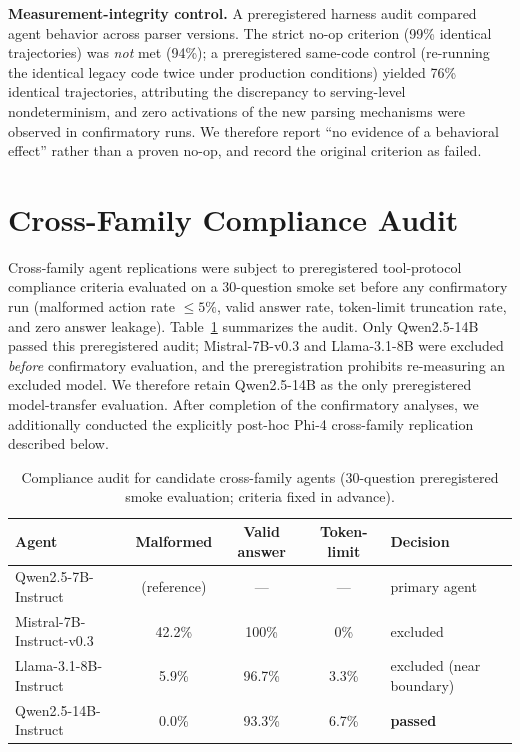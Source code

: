 \documentclass[10pt]{article}
\newcommand{\stitle}[1]{\vspace{0.4em}\noindent\textbf{#1}\hspace{0.6em}}
\begin{document}
\stitle{Measurement-integrity control.}
A preregistered harness audit compared agent behavior across parser
versions. The strict no-op criterion (99\% identical trajectories) was
\emph{not} met (94\%); a preregistered same-code control (re-running the
identical legacy code twice under production conditions) yielded 76\%
identical trajectories, attributing the discrepancy to serving-level
nondeterminism, and zero activations of the new parsing mechanisms were
observed in confirmatory runs. We therefore report ``no evidence of a
behavioral effect'' rather than a proven no-op, and record the original
criterion as failed.

\section{Cross-Family Compliance Audit}
\label{sec:compliance}

Cross-family agent replications were subject to preregistered
tool-protocol compliance criteria evaluated on a 30-question smoke set
before any confirmatory run (malformed action rate $\le5\%$, valid answer
rate, token-limit truncation rate, and zero answer leakage).
Table~\ref{tab:compliance} summarizes the audit.
Only Qwen2.5-14B passed this preregistered audit; Mistral-7B-v0.3 and
Llama-3.1-8B were excluded \emph{before} confirmatory evaluation, and the
preregistration prohibits re-measuring an excluded model. We therefore
retain Qwen2.5-14B as the only preregistered model-transfer evaluation.
After completion of the confirmatory analyses, we additionally conducted the
explicitly post-hoc Phi-4 cross-family replication described below.

\begin{table}[h]
\centering
\small
\caption{Compliance audit for candidate cross-family agents
(30-question preregistered smoke evaluation; criteria fixed in advance).}
\label{tab:compliance}
\begin{tabular}{lcccl}
\toprule
\textbf{Agent} & \textbf{Malformed} & \textbf{Valid answer} &
\textbf{Token-limit} & \textbf{Decision} \\
\midrule
Qwen2.5-7B-Instruct  & (reference) & --- & --- & primary agent \\
Mistral-7B-Instruct-v0.3 & 42.2\% & 100\% & 0\% & excluded \\
Llama-3.1-8B-Instruct & 5.9\% & 96.7\% & 3.3\% & excluded (near boundary) \\
Qwen2.5-14B-Instruct & 0.0\% & 93.3\% & 6.7\% & \textbf{passed} \\
\bottomrule
\end{tabular}
\end{table}
\end{document}

